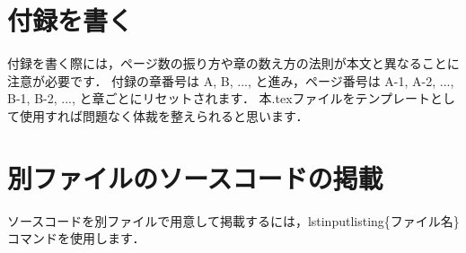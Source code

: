\documentclass[11pt,a4j,onecolumn]{jsreport} %
\renewcommand{\chaptermark}[1]{\markboth{\S\ \normalfont\thechapter\ ~~#1}{}} %
\begin{document}

\renewcommand{\bibname}{参考文献}
\typeout{} %


\appendix %

\renewcommand{\chaptermark}[1]{\markboth{付録\normalfont\thechapter\ ~~#1}{}}

\chapter{付録を書く}
\label{appx:appx}

\renewcommand{\thepage}{\thechapter--\arabic{page}} %
\setcounter{page}{1} %

付録を書く際には，ページ数の振り方や章の数え方の法則が本文と異なることに注意が必要です．
付録の章番号は A, B, ..., と進み，ページ番号は A-1, A-2, ..., B-1, B-2, ..., と章ごとにリセットされます．
本.texファイルをテンプレートとして使用すれば問題なく体裁を整えられると思います．

\chapter{別ファイルのソースコードの掲載}
\label{appx:spectrum}

\setcounter{page}{1}

ソースコードを別ファイルで用意して掲載するには，lstinputlisting\{ファイル名\} コマンドを使用します．



\end{document}

